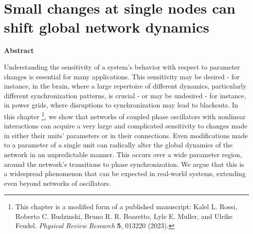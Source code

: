 \chapter{Small changes at single nodes can shift global network dynamics} \label{chap:malleability}



\vspace{1.5em}
\noindent
{\large\textbf{Abstract}} \vspace{0.5cm}

Understanding the sensitivity of a system's behavior with respect to parameter changes is essential for many applications. This sensitivity may be desired - for instance, in the brain, where a large repertoire of different dynamics, particularly different synchronization patterns, is crucial - or may be undesired - for instance, in power grids, where disruptions to synchronization may lead to blackouts. In this chapter \footnote[1]{This chapter is a modified form of a published manuscript: Kalel L. Rossi, Roberto C. Budzinski, Bruno R. R. Boaretto, Lyle E. Muller, and Ulrike Feudel. \textit{Physical Review Research} \textbf{5}, 013220 (2023).}, we show that networks of coupled phase oscillators with nonlinear interactions can acquire a very large and complicated sensitivity to changes made in either their units' parameters or in their connections. Even modifications made to a parameter of a single unit can radically alter the global dynamics of the network in an unpredictable manner. This occurs over a wide parameter region, around the network's transitions to phase synchronization. We argue that this is a widespread phenomenon that can be expected in real-world systems, extending even beyond networks of oscillators. 
\vspace{1.5em}



